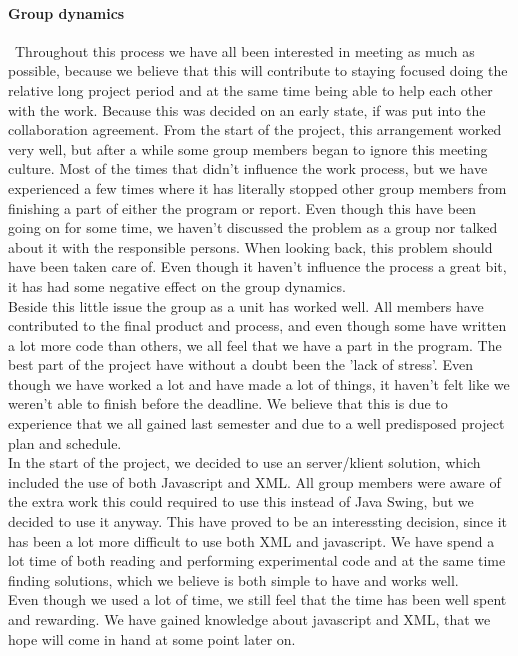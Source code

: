 \documentclass[a4paper,10pt,titlepage]{article}
\begin{document}
		\paragraph{Group dynamics}\mbox{}\
		Throughout this process we have all been interested in meeting as much as possible, because we believe that this will contribute to staying focused doing the relative long project period and at the same time being able to help each other with the work. Because this was decided on an early state, if was put into the collaboration agreement. From the start of the project, this arrangement worked very well, but after a while some group members began to ignore this meeting culture. Most of the times that didn't influence the work process, but we have experienced a few times where it has literally stopped other group members from finishing a part of either the program or report. Even though this have been going on for some time, we haven't discussed the problem as a group nor talked about it with the responsible persons. When looking back, this problem should have been taken care of. Even though it haven't influence the process a great bit, it has had some negative effect on the group dynamics. \\
		Beside this little issue the group as a unit has worked well. All members have contributed to the final product and process, and even though some have written a lot more code than others, we all feel that we have a part in the program. The best part of the project have without a doubt been the 'lack of stress'. Even though we have worked a lot and have made a lot of things, it haven't felt like we weren't able to finish before the deadline. We believe that this is due to experience that we all gained last semester and due to a well predisposed project plan and schedule. \\


In the start of the project, we decided to use an server/klient solution, which included the use of both Javascript and XML. All group members were aware of the extra work this could required to use this instead of Java Swing, but we decided to use it anyway. This have proved to be an interessting decision, since it has been a lot more difficult to use both XML and javascript. We have spend a lot time of both reading and performing experimental code and at the same time finding solutions, which we believe is both simple to have and works well.\\

Even though we used a lot of time, we still feel that the time has been well spent and rewarding. We have gained knowledge about javascript and XML, that we hope will come in hand at some point later on.\\
\end{document}

